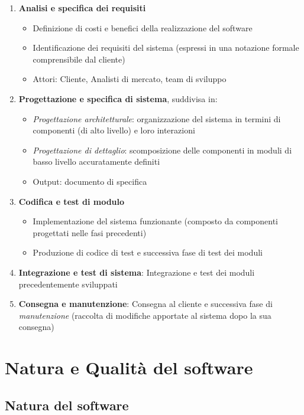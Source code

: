 \begin{enumerate}
    \item \textbf{Analisi e specifica dei requisiti}
    \begin{itemize}
        \item Definizione di costi e benefici della realizzazione del software
        \item Identificazione dei requisiti del sistema (espressi in una notazione formale comprensibile dal cliente)
        \item Attori: Cliente, Analisti di mercato, team di sviluppo
    \end{itemize}
    \item \textbf{Progettazione e specifica di sistema}, suddivisa in:
    \begin{itemize}
        \item \textit{Progettazione architetturale}: organizzazione del sistema in termini di componenti (di alto livello) e loro interazioni
        \item \textit{Progettazione di dettaglio}: scomposizione delle componenti in moduli di basso livello accuratamente definiti
        \item Output: documento di specifica
    \end{itemize}
    \item \textbf{Codifica e test di modulo}
    \begin{itemize}
        \item Implementazione del sistema funzionante (composto da componenti progettati nelle fasi precedenti)
        \item Produzione di codice di test e successiva fase di test dei moduli
    \end{itemize}
    \item \textbf{Integrazione e test di sistema}: Integrazione e test dei moduli precedentemente sviluppati
    \item \textbf{Consegna e manutenzione}: Consegna al cliente e successiva fase di \textit{manutenzione} (raccolta di modifiche apportate al sistema dopo la sua consegna)
\end{enumerate}

\section{Natura e Qualità del software}

\subsection{Natura del software}


